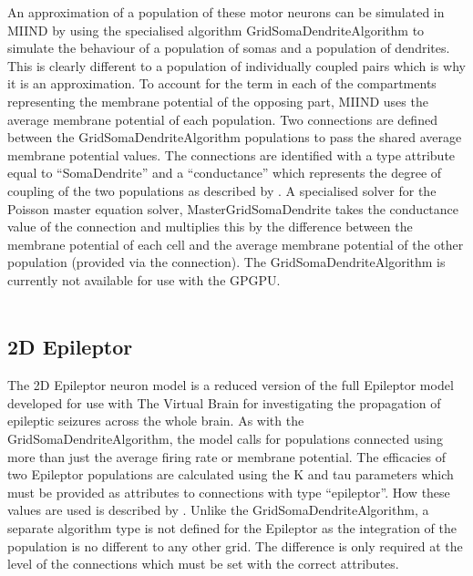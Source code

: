\documentclass[utf8]{frontiers_suppmat} %
\begin{document}
An approximation of a population of these motor neurons can be simulated in MIIND by using the specialised algorithm GridSomaDendriteAlgorithm to simulate the behaviour of a population of somas and a population of dendrites. This is clearly different to a population of individually coupled pairs which is why it is an approximation. To account for the term in each of the compartments representing the membrane potential of the opposing part, MIIND uses the average membrane potential of each population. Two connections are defined between the GridSomaDendriteAlgorithm populations to pass the shared average membrane potential values. The connections are identified with a type attribute equal to ``SomaDendrite'' and a ``conductance'' which represents the degree of coupling of the two populations as described by \cite{booth1995minimal}. A specialised solver for the Poisson master equation solver, MasterGridSomaDendrite takes the conductance value of the connection and multiplies this by the difference between the membrane potential of each cell and the average membrane potential of the other population (provided via the connection). The GridSomaDendriteAlgorithm is currently not available for use with the GPGPU.\\
\\
\subsection{2D Epileptor}
The 2D Epileptor neuron model \citep{proix2014permittivity,proix2017individual} is a reduced version of the full Epileptor model \citep{jirsa2014nature} developed for use with The Virtual Brain for investigating the propagation of epileptic seizures across the whole brain. As with the GridSomaDendriteAlgorithm, the model calls for populations connected using more than just the average firing rate or membrane potential. The efficacies of two Epileptor populations are calculated using the K and tau parameters which must be provided as attributes to connections with type ``epileptor''. How these values are used is described by \cite{proix2014permittivity}. Unlike the GridSomaDendriteAlgorithm, a separate algorithm type is not defined for the Epileptor as the integration of the population is no different to any other grid. The difference is only required at the level of the connections which must be set with the correct attributes.
\end{document}
